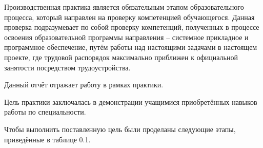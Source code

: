 
Производственная практика является обязательным этапом образовательного процесса, который направлен на проверку компетенцией обучающегося.
Данная проверка подразумевает по собой проверку компетенций, полученных в процессе освоения образовательной программы направления -- системное прикладное и программное обеспечение, путём работы над настоящими задачами в настоящем проекте, 
где трудовой распорядок максимально приближен к официальной занятости посредством трудоустройства.

Данный отчёт отражает работу в рамках практики. 

Цель практики заключалась в демонстрации учащимися приобретённых навыков работы по специальности.

Чтобы выполнить поставленную цель были проделаны следующие этапы, приведённые в таблице 0.1.

